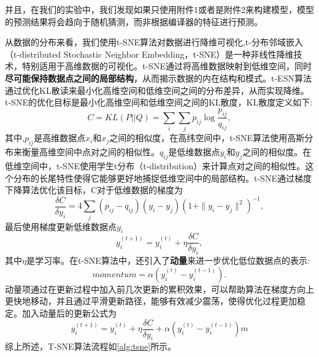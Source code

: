 并且，在我们的实验中，我们发现如果只使用附件1或者是附件2来构建模型，模型的预测结果将会趋向于随机猜测，而非根据编译器的特征进行预测。
\par
从数据的分布来看，我们使用t-SNE算法对数据进行降维可视化,t-分布邻域嵌入（t-distributed Stochastic Neighbor Embedding，t-SNE）\cite{JMLR:v9:vandermaaten08a}是一种非线性降维技术，特别适用于高维数据的可视化。t-SNE通过将高维数据映射到低维空间，同时\textbf{尽可能保持数据点之间的局部结构}，从而揭示数据的内在结构和模式。t-ESN算法通过优化KL散读来最小化高维空间和低维空间之间的分布差异，从而实现降维。t-SNE的优化目标是最小化高维空间和低维空间之间的KL散度，KL散度定义如下:
\begin{equation}
	C=KL(P||Q)=\sum_i\sum_jp_{ij}\log\frac{p_{ij}}{q_{ij}},
\end{equation}
其中,$p_{ij}$是高维数据点$x_i$和$x_j$之间的相似度，在高纬空间中，t-SNE算法使用高斯分布来衡量高维空间中点对之间的相似性。$q_{ij}$是低维数据点$y_i$和$y_j$之间的相似度。在低维空间中，t-SNE使用学生t分布（t-distribution）来计算点对之间的相似性。这个分布的长尾特性使得它能够更好地捕捉低维空间中的局部结构。t-SNE通过梯度下降算法优化该目标，C对于低维数据的梯度为
\begin{equation}
	\frac{\delta C}{\delta y_i}=4\sum_j(p_{ij}-q_{ij})(y_i-y_j)\left(1+\|y_i-y_j\|^2\right)^{-1},
\end{equation}
最后使用梯度更新低维数据点$y_i$
\begin{equation}
	y_i^{(t+1)}=y_i^{(t)}+\eta\frac{\delta C}{\delta y_i},
\end{equation}
其中$\eta$是学习率。在t-SNE算法中，还引入了\textbf{动量}来进一步优化低位数据点的表示:
\begin{equation}
	momentum=\alpha(y_i^{(t)}-y_i^{(t-1)}).
\end{equation}
动量项通过在更新过程中加入前几次更新的累积效果，可以帮助算法在梯度方向上更快地移动，并且通过平滑更新路径，能够有效减少震荡，使得优化过程更加稳定。加入动量后的更新公式为
\begin{equation}
	y_i^{(t+1)}=y_i^{(t)}+\eta\frac{\delta C}{\delta y_i}+\alpha(y_i^{(t)}-y_i^{(t-1)})m
\end{equation}
综上所述，T-SNE算法流程如\autoref{alg:tsne}所示。
